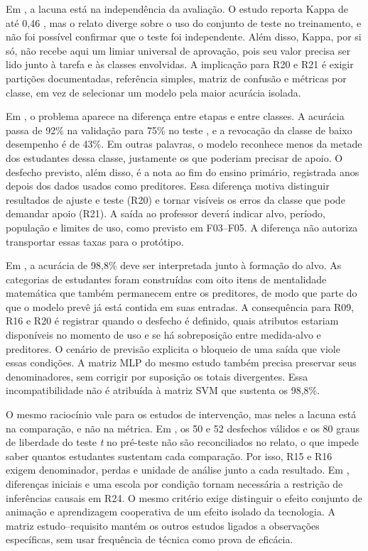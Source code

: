 Em , a lacuna está na independência da avaliação. O estudo reporta Kappa de até 0,46 \cite[Tabela~VI]{Math2021_001}, mas o relato diverge sobre o uso do conjunto de teste no treinamento, e não foi possível confirmar que o teste foi independente. Além disso, Kappa, por si só, não recebe aqui um limiar universal de aprovação, pois seu valor precisa ser lido junto à tarefa e às classes envolvidas. A implicação para R20 e R21 é exigir partições documentadas, referência simples, matriz de confusão e métricas por classe, em vez de selecionar um modelo pela maior acurácia isolada.

Em , o problema aparece na diferença entre etapas e entre classes. A acurácia passa de 92\% na validação para 75\% no teste \cite[Tabela~8]{Implementation2025_000}, e a revocação da classe de baixo desempenho é de 43\%. Em outras palavras, o modelo reconhece menos da metade dos estudantes dessa classe, justamente os que poderiam precisar de apoio. O desfecho previsto, além disso, é a nota ao fim do ensino primário, registrada anos depois dos dados usados como preditores. Essa diferença motiva distinguir resultados de ajuste e teste (R20) e tornar visíveis os erros da classe que pode demandar apoio (R21). A saída ao professor deverá indicar alvo, período, população e limites de uso, como previsto em F03--F05. A diferença não autoriza transportar essas taxas para o protótipo.

Em , a acurácia de 98,8\% deve ser interpretada junto à formação do alvo. As categorias de estudantes foram construídas com oito itens de mentalidade matemática que também permanecem entre os preditores, de modo que parte do que o modelo prevê já está contida em suas entradas. A consequência para R09, R16 e R20 é registrar quando o desfecho é definido, quais atributos estariam disponíveis no momento de uso e se há sobreposição entre medida-alvo e preditores. O cenário de previsão explicita o bloqueio de uma saída que viole essas condições. A matriz MLP do mesmo estudo também precisa preservar seus denominadores, sem corrigir por suposição os totais divergentes. Essa incompatibilidade não é atribuída à matriz SVM que sustenta os 98,8\%.

O mesmo raciocínio vale para os estudos de intervenção, mas neles a lacuna está na comparação, e não na métrica. Em , os 50 e 52 desfechos válidos e os 80 graus de liberdade do teste \textit{t} no pré-teste não são reconciliados no relato, o que impede saber quantos estudantes sustentam cada comparação. Por isso, R15 e R16 exigem denominador, perdas e unidade de análise junto a cada resultado. Em , diferenças iniciais e uma escola por condição tornam necessária a restrição de inferências causais em R24. O mesmo critério exige distinguir o efeito conjunto de animação e aprendizagem cooperativa de um efeito isolado da tecnologia. A matriz estudo--requisito mantém os outros estudos ligados a observações específicas, sem usar frequência de técnica como prova de eficácia.

